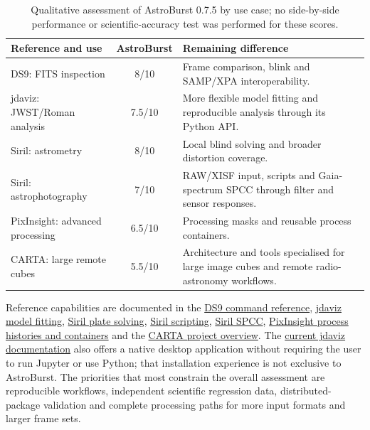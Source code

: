 \documentclass[11pt,a4paper]{article}
\begin{document}
    \begin{table}[H]
    \centering
    \small
    \begin{tabularx}{\textwidth}{p{3.1cm}cX}
    \toprule
    \textbf{Reference and use} & \textbf{AstroBurst} & \textbf{Remaining difference} \\
    \midrule
    DS9: FITS inspection & 8/10 & Frame comparison, blink and SAMP/XPA interoperability. \\
    jdaviz: JWST/Roman analysis & 7.5/10 & More flexible model fitting and reproducible analysis through its Python API. \\
    Siril: astrometry & 8/10 & Local blind solving and broader distortion coverage. \\
    Siril: astrophotography & 7/10 & RAW/XISF input, scripts and Gaia-spectrum SPCC through filter and sensor responses. \\
    PixInsight: advanced processing & 6.5/10 & Processing masks and reusable process containers. \\
    CARTA: large remote cubes & 5.5/10 & Architecture and tools specialised for large image cubes and remote radio-astronomy workflows. \\
    \bottomrule
    \end{tabularx}
    \caption{Qualitative assessment of AstroBurst 0.7.5 by use case; no side-by-side performance or scientific-accuracy test was performed for these scores.}
    \end{table}

    Reference capabilities are documented in the \href{https://ds9.si.edu/doc/ref/samp.html}{DS9 command reference}, \href{https://jdaviz.readthedocs.io/en/stable/plugins/model_fitting.html}{jdaviz model fitting}, \href{https://siril.readthedocs.io/en/stable/astrometry/platesolving.html}{Siril plate solving}, \href{https://siril.readthedocs.io/en/stable/Scripts.html}{Siril scripting}, \href{https://siril.readthedocs.io/en/stable/processing/color-calibration/spcc.html}{Siril SPCC}, \href{https://pixinsight.com/astrophotocl/outreach/pixinsight_eccai_2006.pdf}{PixInsight process histories and containers} and the \href{https://cartavis.org/}{CARTA project overview}. The \href{https://jdaviz.readthedocs.io/en/stable/}{current jdaviz documentation} also offers a native desktop application without requiring the user to run Jupyter or use Python; that installation experience is not exclusive to AstroBurst. The priorities that most constrain the overall assessment are reproducible workflows, independent scientific regression data, distributed-package validation and complete processing paths for more input formats and larger frame sets.
\end{document}
